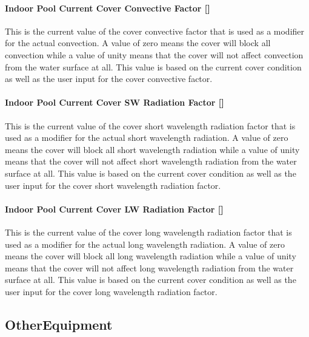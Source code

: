 \paragraph{Indoor Pool Current Cover Convective Factor {[]}}\label{indoor-pool-current-cover-convective-factor}

This is the current value of the cover convective factor that is used as a modifier for the actual convection.  A value of zero means the cover will block all convection while a value of unity means that the cover will not affect convection from the water surface at all.  This value is based on the current cover condition as well as the user input for the cover convective factor.

\paragraph{Indoor Pool Current Cover SW Radiation Factor {[]}}\label{indoor-pool-current-cover-sw-radiation-factor}

This is the current value of the cover short wavelength radiation factor that is used as a modifier for the actual short wavelength radiation.  A value of zero means the cover will block all short wavelength radiation while a value of unity means that the cover will not affect short wavelength radiation from the water surface at all.  This value is based on the current cover condition as well as the user input for the cover short wavelength radiation factor.

\paragraph{Indoor Pool Current Cover LW Radiation Factor {[]}}\label{indoor-pool-current-cover-lw-radiation-factor}

This is the current value of the cover long wavelength radiation factor that is used as a modifier for the actual long wavelength radiation.  A value of zero means the cover will block all long wavelength radiation while a value of unity means that the cover will not affect long wavelength radiation from the water surface at all.  This value is based on the current cover condition as well as the user input for the cover long wavelength radiation factor.

\subsection{OtherEquipment}\label{otherequipment}

